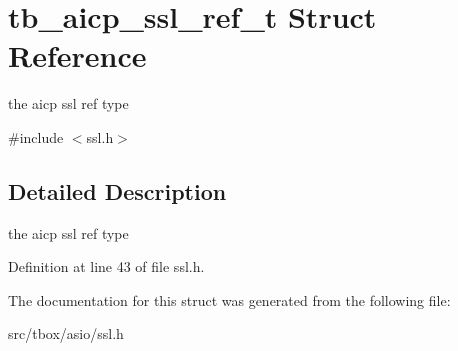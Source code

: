 \hypertarget{structtb__aicp__ssl__ref__t}{\section{tb\-\_\-aicp\-\_\-ssl\-\_\-ref\-\_\-t Struct Reference}
\label{structtb__aicp__ssl__ref__t}
}


the aicp ssl ref type  




{\ttfamily \#include $<$ssl.\-h$>$}



\subsection{Detailed Description}
the aicp ssl ref type 

Definition at line 43 of file ssl.\-h.



The documentation for this struct was generated from the following file\-:\begin{DoxyCompactItemize}
\item 
src/tbox/asio/ssl.\-h\end{DoxyCompactItemize}
